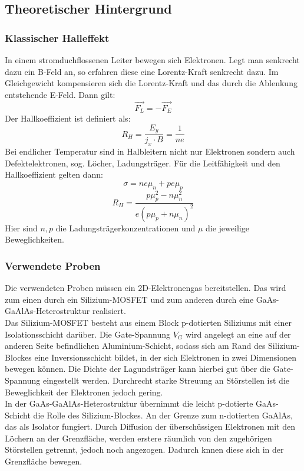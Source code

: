 \subsection{Theoretischer Hintergrund}
\subsubsection{Klassischer Halleffekt}
In einem stromduchflossenen Leiter bewegen sich Elektronen. Legt man senkrecht dazu ein B-Feld an, so erfahren diese eine Lorentz-Kraft senkrecht dazu. Im Gleichgewicht kompensieren sich die Lorentz-Kraft und das durch die Ablenkung entstehende E-Feld. Dann gilt:
$$\vec{F_L} = - \vec{F_E} $$
Der Hallkoeffizient ist definiert als:
$$ R_H = \frac{E_y}{j_x \cdot B} = \frac{1}{n e}$$
Bei endlicher Temperatur sind in Halbleitern nicht nur Elektronen sondern auch Defektelektronen, sog. Löcher, Ladungsträger. Für die Leitfähigkeit und den Hallkoeffizient gelten dann:
$$\sigma = ne\mu _n + pe\mu_p $$
$$R_H = \frac{p \mu _p ^{2} - n \mu _n ^{2}}{e(p\mu_p + n \mu _n)^{2}} $$
Hier sind $n,p$ die Ladungsträgerkonzentrationen und $\mu$ die jeweilige Beweglichkeiten.
\subsubsection{Verwendete Proben}
Die verwendeten Proben müssen ein 2D-Elektronengas bereitstellen. Das wird zum einen durch ein Silizium-MOSFET und zum anderen durch eine GaAs-GaAlAs-Heterostruktur realisiert.\\

Das Silizium-MOSFET besteht aus einem Block p-dotierten Siliziums mit einer Isolationsschicht darüber. Die Gate-Spannung $V_G$ wird angelegt an eine auf der anderen Seite befindlichen Aluminium-Schicht, sodass sich am Rand des Silizium-Blockes eine Inversionsschicht bildet, in der sich Elektronen in zwei Dimensionen bewegen können. Die Dichte der Lagundsträger kann hierbei gut über die Gate-Spannung eingestellt werden. Durchrecht starke Streuung an Störstellen ist die Beweglichkeit der Elektronen jedoch gering. \\

In der GaAs-GaAlAs-Heterostruktur übernimmt die leicht p-dotierte GaAs-Schicht die Rolle des Silizium-Blockes. An der Grenze zum n-dotierten GaAlAs, das als Isolator fungiert. Durch Diffusion der überschüssigen Elektronen mit den Löchern an der Grenzfläche, werden erstere räumlich von den zugehörigen Störstellen getrennt, jedoch noch angezogen. Dadurch knnen diese sich in der Grenzfläche bewegen. 
